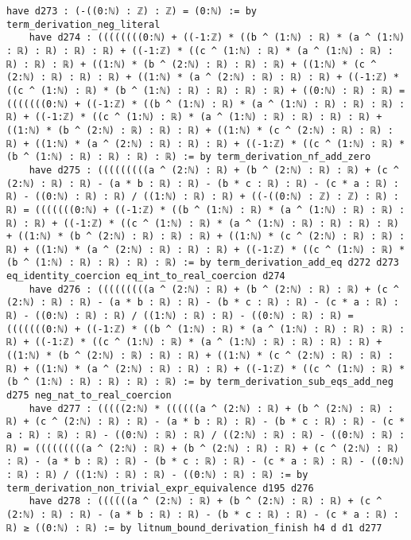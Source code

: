 \documentclass{article}
\begin{document}
\begin{tcolorbox}[colback=white!10, width=\linewidth]
\begin{lstlisting}[language=Lean4]
    have d273 : (-((0:ℕ) : ℤ) : ℤ) = (0:ℕ) := by term_derivation_neg_literal
    have d274 : ((((((((0:ℕ) + ((-1:ℤ) * ((b ^ (1:ℕ) : ℝ) * (a ^ (1:ℕ) : ℝ) : ℝ) : ℝ) : ℝ) + ((-1:ℤ) * ((c ^ (1:ℕ) : ℝ) * (a ^ (1:ℕ) : ℝ) : ℝ) : ℝ) : ℝ) + ((1:ℕ) * (b ^ (2:ℕ) : ℝ) : ℝ) : ℝ) + ((1:ℕ) * (c ^ (2:ℕ) : ℝ) : ℝ) : ℝ) + ((1:ℕ) * (a ^ (2:ℕ) : ℝ) : ℝ) : ℝ) + ((-1:ℤ) * ((c ^ (1:ℕ) : ℝ) * (b ^ (1:ℕ) : ℝ) : ℝ) : ℝ) : ℝ) + ((0:ℕ) : ℝ) : ℝ) = (((((((0:ℕ) + ((-1:ℤ) * ((b ^ (1:ℕ) : ℝ) * (a ^ (1:ℕ) : ℝ) : ℝ) : ℝ) : ℝ) + ((-1:ℤ) * ((c ^ (1:ℕ) : ℝ) * (a ^ (1:ℕ) : ℝ) : ℝ) : ℝ) : ℝ) + ((1:ℕ) * (b ^ (2:ℕ) : ℝ) : ℝ) : ℝ) + ((1:ℕ) * (c ^ (2:ℕ) : ℝ) : ℝ) : ℝ) + ((1:ℕ) * (a ^ (2:ℕ) : ℝ) : ℝ) : ℝ) + ((-1:ℤ) * ((c ^ (1:ℕ) : ℝ) * (b ^ (1:ℕ) : ℝ) : ℝ) : ℝ) : ℝ) := by term_derivation_nf_add_zero
    have d275 : (((((((((a ^ (2:ℕ) : ℝ) + (b ^ (2:ℕ) : ℝ) : ℝ) + (c ^ (2:ℕ) : ℝ) : ℝ) - (a * b : ℝ) : ℝ) - (b * c : ℝ) : ℝ) - (c * a : ℝ) : ℝ) - ((0:ℕ) : ℝ) : ℝ) / ((1:ℕ) : ℝ) : ℝ) + ((-((0:ℕ) : ℤ) : ℤ) : ℝ) : ℝ) = (((((((0:ℕ) + ((-1:ℤ) * ((b ^ (1:ℕ) : ℝ) * (a ^ (1:ℕ) : ℝ) : ℝ) : ℝ) : ℝ) + ((-1:ℤ) * ((c ^ (1:ℕ) : ℝ) * (a ^ (1:ℕ) : ℝ) : ℝ) : ℝ) : ℝ) + ((1:ℕ) * (b ^ (2:ℕ) : ℝ) : ℝ) : ℝ) + ((1:ℕ) * (c ^ (2:ℕ) : ℝ) : ℝ) : ℝ) + ((1:ℕ) * (a ^ (2:ℕ) : ℝ) : ℝ) : ℝ) + ((-1:ℤ) * ((c ^ (1:ℕ) : ℝ) * (b ^ (1:ℕ) : ℝ) : ℝ) : ℝ) : ℝ) := by term_derivation_add_eq d272 d273 eq_identity_coercion eq_int_to_real_coercion d274
    have d276 : (((((((((a ^ (2:ℕ) : ℝ) + (b ^ (2:ℕ) : ℝ) : ℝ) + (c ^ (2:ℕ) : ℝ) : ℝ) - (a * b : ℝ) : ℝ) - (b * c : ℝ) : ℝ) - (c * a : ℝ) : ℝ) - ((0:ℕ) : ℝ) : ℝ) / ((1:ℕ) : ℝ) : ℝ) - ((0:ℕ) : ℝ) : ℝ) = (((((((0:ℕ) + ((-1:ℤ) * ((b ^ (1:ℕ) : ℝ) * (a ^ (1:ℕ) : ℝ) : ℝ) : ℝ) : ℝ) + ((-1:ℤ) * ((c ^ (1:ℕ) : ℝ) * (a ^ (1:ℕ) : ℝ) : ℝ) : ℝ) : ℝ) + ((1:ℕ) * (b ^ (2:ℕ) : ℝ) : ℝ) : ℝ) + ((1:ℕ) * (c ^ (2:ℕ) : ℝ) : ℝ) : ℝ) + ((1:ℕ) * (a ^ (2:ℕ) : ℝ) : ℝ) : ℝ) + ((-1:ℤ) * ((c ^ (1:ℕ) : ℝ) * (b ^ (1:ℕ) : ℝ) : ℝ) : ℝ) : ℝ) := by term_derivation_sub_eqs_add_neg d275 neg_nat_to_real_coercion
    have d277 : (((((2:ℕ) * ((((((a ^ (2:ℕ) : ℝ) + (b ^ (2:ℕ) : ℝ) : ℝ) + (c ^ (2:ℕ) : ℝ) : ℝ) - (a * b : ℝ) : ℝ) - (b * c : ℝ) : ℝ) - (c * a : ℝ) : ℝ) : ℝ) - ((0:ℕ) : ℝ) : ℝ) / ((2:ℕ) : ℝ) : ℝ) - ((0:ℕ) : ℝ) : ℝ) = (((((((((a ^ (2:ℕ) : ℝ) + (b ^ (2:ℕ) : ℝ) : ℝ) + (c ^ (2:ℕ) : ℝ) : ℝ) - (a * b : ℝ) : ℝ) - (b * c : ℝ) : ℝ) - (c * a : ℝ) : ℝ) - ((0:ℕ) : ℝ) : ℝ) / ((1:ℕ) : ℝ) : ℝ) - ((0:ℕ) : ℝ) : ℝ) := by term_derivation_non_trivial_expr_equivalence d195 d276
    have d278 : ((((((a ^ (2:ℕ) : ℝ) + (b ^ (2:ℕ) : ℝ) : ℝ) + (c ^ (2:ℕ) : ℝ) : ℝ) - (a * b : ℝ) : ℝ) - (b * c : ℝ) : ℝ) - (c * a : ℝ) : ℝ) ≥ ((0:ℕ) : ℝ) := by litnum_bound_derivation_finish h4 d d1 d277

\end{lstlisting}
\end{tcolorbox}
\end{document}
